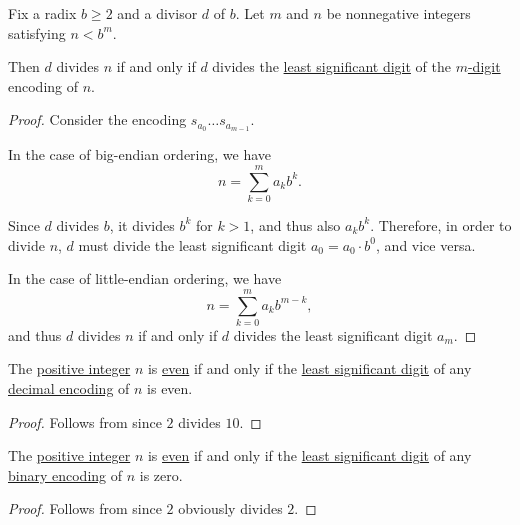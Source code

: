 \begin{proposition}\label{thm:nonnegative_integer_expansion_divisibility}
  Fix a radix \( b \geq 2 \) and a divisor \( d \) of \( b \). Let \( m \) and \( n \) be nonnegative integers satisfying \( n < b^m \).

  Then \( d \) divides \( n \) if and only if \( d \) divides the \hyperref[def:endianness]{least significant digit} of the \hyperref[def:fixed_length_nonnegative_integer_encoding]{\( m \)-digit} encoding of \( n \).
\end{proposition}
\begin{proof}
  Consider the encoding \( s_{a_0} \ldots s_{a_{m-1}} \).

  In the case of big-endian ordering, we have
  \begin{equation*}
    n = \sum_{k=0}^m a_k b^k.
  \end{equation*}

  Since \( d \) divides \( b \), it divides \( b^k \) for \( k > 1 \), and thus also \( a_k b^k \). Therefore, in order to divide \( n \), \( d \) must divide the least significant digit \( a_0 = a_0 \cdot b^0 \), and vice versa.

  In the case of little-endian ordering, we have
  \begin{equation*}
    n = \sum_{k=0}^m a_k b^{m-k},
  \end{equation*}
  and thus \( d \) divides \( n \) if and only if \( d \) divides the least significant digit \( a_m \).
\end{proof}

\begin{corollary}\label{thm:nonnegative_integer_decimal_expansion_parity}
  The \hyperref[def:integers]{positive integer} \( n \) is \hyperref[def:integer_parity]{even} if and only if the \hyperref[def:endianness]{least significant digit} of any \hyperref[def:fixed_length_nonnegative_integer_encoding]{decimal encoding} of \( n \) is even.
\end{corollary}
\begin{proof}
  Follows from  since \( 2 \) divides \( 10 \).
\end{proof}

\begin{corollary}\label{thm:nonnegative_integer_binary_expansion_parity}
  The \hyperref[def:integers]{positive integer} \( n \) is \hyperref[def:integer_parity]{even} if and only if the \hyperref[def:endianness]{least significant digit} of any \hyperref[def:fixed_length_nonnegative_integer_encoding]{binary encoding} of \( n \) is zero.
\end{corollary}
\begin{proof}
  Follows from  since \( 2 \) obviously divides \( 2 \).
\end{proof}

